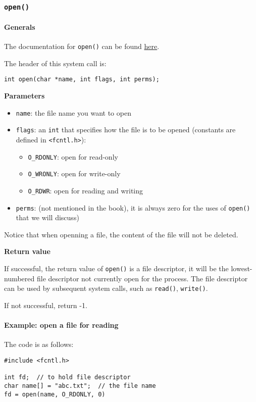 \documentclass[11pt]{article}
\begin{document}
\subsubsection{\texttt{open()}}
\label{sec:orgcfa877d}
\paragraph{Generals}
\label{sec:orgbd8ecaf}
The documentation for \texttt{open()} can be found \href{http://man7.org/linux/man-pages/man2/open.2.html}{here}.

The header of this system call is:
\begin{verbatim}
int open(char *name, int flags, int perms);
\end{verbatim}
\textbf{Parameters}
\begin{itemize}
\item \texttt{name}: the file name you want to open
\item \texttt{flags}: an \texttt{int} that specifies how the file is to be opened (constants are defined in \texttt{<fcntl.h>}):
\begin{itemize}
\item \texttt{O\_RDONLY}: open for read-only
\item \texttt{O\_WRONLY}: open for write-only
\item \texttt{O\_RDWR}: open for reading and writing
\end{itemize}
\item \texttt{perms}: (not mentioned in the book), it is always zero for the uses of \texttt{open()} that we will discuss)
\end{itemize}

Notice that when openning a file, the content of the file will not be deleted.

\textbf{Return value}

If successful, the return value of \texttt{open()} is a file descriptor, it will be the lowest-numbered file descriptor not currently open for the process. The file descriptor can be used by subsequent system calls, such as \texttt{read()}, \texttt{write()}.

If not successful, return -1.

\paragraph{Example: open a file for reading}
\label{sec:org1acca4d}
The code is as follows:
\begin{verbatim}
#include <fcntl.h>

int fd;  // to hold file descriptor
char name[] = "abc.txt";  // the file name
fd = open(name, O_RDONLY, 0)
\end{verbatim}
\end{document}
